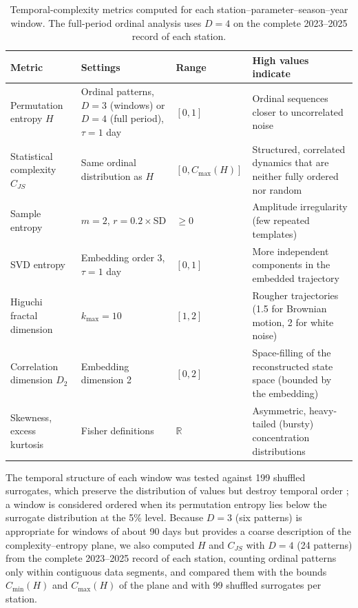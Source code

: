 \documentclass[a4paper,fleqn]{cas-sc}
\begin{document}
\begin{table}[!htbp]
\centering
\footnotesize
\caption{Temporal-complexity metrics computed for each station--parameter--season--year window. The full-period ordinal analysis uses $D=4$ on the complete 2023--2025 record of each station.}
\label{tab:metrics}
\begin{tabular}{p{3.3cm}p{4.4cm}p{1.6cm}p{5.0cm}}
\toprule
\textbf{Metric} & \textbf{Settings} & \textbf{Range} & \textbf{High values indicate} \\
\midrule
Permutation entropy $H$ & Ordinal patterns, $D=3$ (windows) or $D=4$ (full period), $\tau=1$ day & $[0,1]$ & Ordinal sequences closer to uncorrelated noise \\
Statistical complexity $C_{JS}$ & Same ordinal distribution as $H$ & $[0,C_{\max}(H)]$ & Structured, correlated dynamics that are neither fully ordered nor random \\
Sample entropy & $m=2$, $r=0.2\times$SD & $\geq 0$ & Amplitude irregularity (few repeated templates) \\
SVD entropy & Embedding order 3, $\tau=1$ day & $[0,1]$ & More independent components in the embedded trajectory \\
Higuchi fractal dimension & $k_{\max}=10$ & $[1,2]$ & Rougher trajectories (1.5 for Brownian motion, 2 for white noise) \\
Correlation dimension $D_2$ & Embedding dimension 2 & $[0,2]$ & Space-filling of the reconstructed state space (bounded by the embedding) \\
Skewness, excess kurtosis & Fisher definitions & $\mathbb{R}$ & Asymmetric, heavy-tailed (bursty) concentration distributions \\
\bottomrule
\end{tabular}
\end{table}

The temporal structure of each window was tested against 199 shuffled surrogates, which preserve the distribution of values but destroy temporal order \citep{Theiler1992}; a window is considered ordered when its permutation entropy lies below the surrogate distribution at the 5\% level. Because $D=3$ (six patterns) is appropriate for windows of about 90 days but provides a coarse description of the complexity--entropy plane, we also computed $H$ and $C_{JS}$ with $D=4$ (24 patterns) from the complete 2023--2025 record of each station, counting ordinal patterns only within contiguous data segments, and compared them with the bounds $C_{\min}(H)$ and $C_{\max}(H)$ of the plane \citep{Martin2006} and with 99 shuffled surrogates per station.
\end{document}
